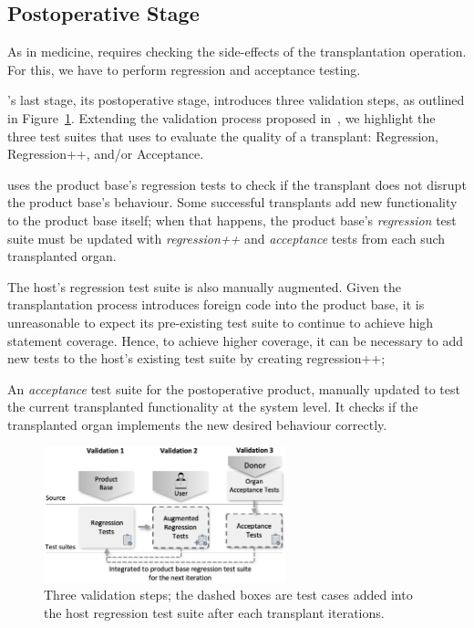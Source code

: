 \subsection{Postoperative Stage} \label{ch:postoperative}

As in medicine, \FOUNDRY requires checking the side-effects of the transplantation operation. For this, we have to perform regression and acceptance testing. 

\FOUNDRY's last stage, its postoperative stage, introduces three validation steps, as outlined in Figure~\ref{fig:postoperative_tests}. Extending the validation process proposed in~\cite{Harman2013, Barr2015}, we highlight the three test suites that \FOUNDRY uses to evaluate the quality of a transplant:  Regression, Regression++, and/or Acceptance.

\FOUNDRY uses the product base's regression tests to check if the transplant does not disrupt the product base's behaviour. Some successful transplants add new functionality to the product base itself;  when that happens, the product base's \emph{regression} test suite must be updated with \emph{regression++} and  \emph{acceptance} tests from each such transplanted organ.

The  host's regression test suite is also manually augmented. Given the transplantation process introduces foreign code into the product base, it is unreasonable to expect its pre-existing test suite to continue to achieve high statement coverage. Hence, to achieve higher coverage, it can be necessary to add new tests to the host's existing test suite by creating regression++; %

An \emph{acceptance} test suite for the postoperative product, manually updated to test the current transplanted functionality at the system level. It checks if the transplanted organ implements the new desired behaviour correctly. 

\begin{figure}[t]
	\centering \includegraphics[width=7cm]{images/postoperative_tests2.png}
	\caption{Three validation steps; the dashed boxes are test cases added into the host regression test suite after each transplant iterations.}
	\label{fig:postoperative_tests}
\end{figure} 

